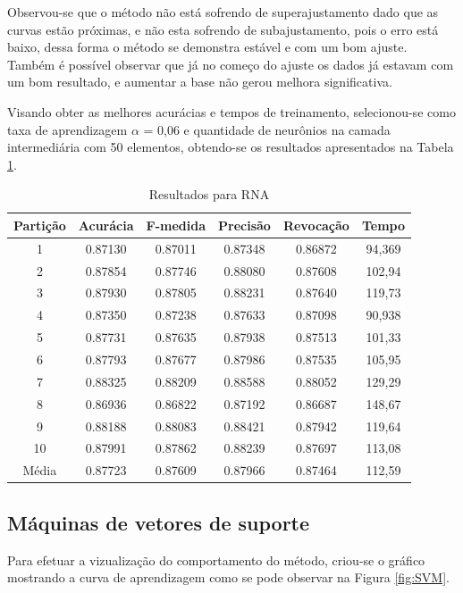 Observou-se que o método não está sofrendo de superajustamento dado que as curvas estão próximas, e não esta sofrendo de subajustamento, pois o erro está baixo, dessa forma o método se demonstra estável e com um bom ajuste. Também é possível observar que já no começo do ajuste os dados já estavam com um bom resultado, e aumentar a base não gerou melhora significativa.

Visando obter as melhores acurácias e tempos de treinamento, selecionou-se como taxa de aprendizagem \(\alpha\) = 0,06 e quantidade de neurônios na camada intermediária com 50 elementos, obtendo-se os resultados apresentados na Tabela \ref{table:resultadosRNA}.

\begin{table}[h]
\centering
\caption{Resultados para RNA}
\vspace{0.2cm}
\begin{tabular}{c|c|c|c|c|c}
Partição & Acurácia & F-medida & Precisão & Revocação & Tempo \\
\hline
1  & 0.87130 & 0.87011 & 0.87348 & 0.86872 & 94,369 \\
2  & 0.87854 & 0.87746 & 0.88080 & 0.87608 & 102,94 \\
3  & 0.87930 & 0.87805 & 0.88231 & 0.87640 & 119,73 \\
4  & 0.87350 & 0.87238 & 0.87633 & 0.87098 & 90,938 \\
5  & 0.87731 & 0.87635 & 0.87938 & 0.87513 & 101,33 \\
6  & 0.87793 & 0.87677 & 0.87986 & 0.87535 & 105,95 \\
7  & 0.88325 & 0.88209 & 0.88588 & 0.88052 & 129,29 \\
8  & 0.86936 & 0.86822 & 0.87192 & 0.86687 & 148,67 \\
9  & 0.88188 & 0.88083 & 0.88421 & 0.87942 & 119,64 \\
10 & 0.87991 & 0.87862 & 0.88239 & 0.87697 & 113,08 \\
\hline
Média & 0.87723 & 0.87609 & 0.87966 & 0.87464 & 112,59 \\
\end{tabular} 
\label{table:resultadosRNA}
\end{table}

\subsection{Máquinas de vetores de suporte}
	
Para efetuar a vizualização do comportamento do método, criou-se o gráfico mostrando a curva de aprendizagem como se pode observar na Figura \ref{fig:SVM}.


